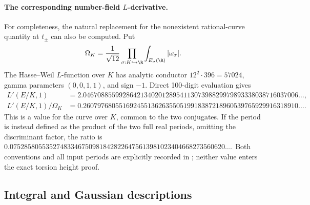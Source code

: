 \paragraph{The corresponding number-field $L$-derivative.}
For completeness, the natural replacement for the nonexistent
rational-curve quantity at $t_\pm$ can also be computed. Put
\[
 \Omega_K=\frac1{\sqrt{12}}
  \prod_{\sigma:K\hookrightarrow\R}
       \int_{E_\sigma(\R)}|\omega_\sigma|.
\]
The Hasse--Weil $L$-function over $K$ has analytic conductor
$12^2\cdot396=57024$, gamma parameters $(0,0,1,1)$, and sign
$-1$. Direct 100-digit evaluation gives
\begin{align*}
 L'(E/K,1)&=2.046708855992864213402012895411307398829979893338038716037006\ldots,\\
 L'(E/K,1)/\Omega_K
 &=0.260797680551692455136263550519918387218960539765929916318910\ldots.
\end{align*}
This is a value for the curve over $K$, common to the two
conjugates. If the period is instead defined as the product of
the two full real periods, omitting the discriminant factor,
the ratio is
$0.075285805535274833467509818428226475613981023404668273560620\ldots$.
Both conventions and all input periods are explicitly recorded
in ; neither value enters
the exact torsion height proof.



\subsection{Integral and Gaussian descriptions}

